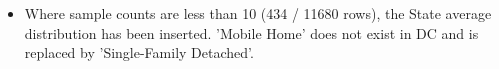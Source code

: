 \begin{itemize}
\item Where sample counts are less than 10 (434 / 11680 rows), the State average distribution has been inserted. 'Mobile Home' does not exist in DC and is replaced by 'Single-Family Detached'.
\end{itemize}
